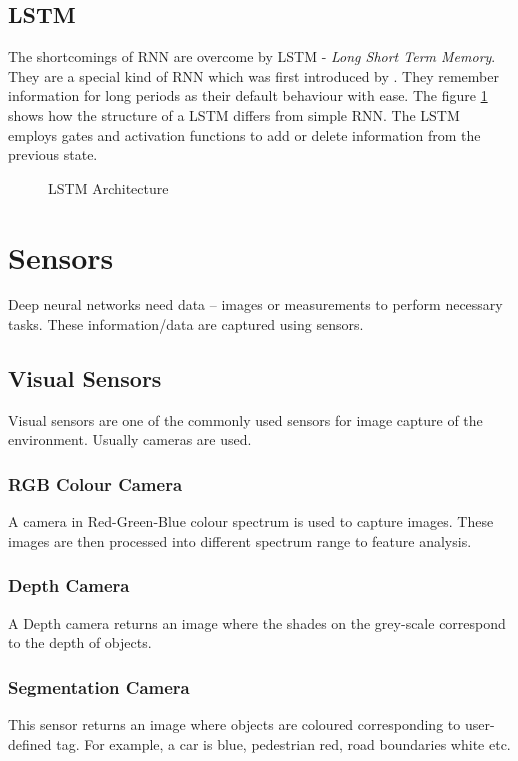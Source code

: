 \subsection{LSTM}
\label{subsubsec:lstm}
The shortcomings of RNN are overcome by LSTM - \textit{Long Short Term Memory}.
They are a special kind of RNN which was first introduced by \cite{LSTMPaper}. They remember
information for long periods as their default behaviour with ease. The figure
\ref{fig:lstm} shows how the structure of a LSTM differs from simple RNN. The LSTM employs
gates and activation functions to add or delete information from the previous state.

\begin{figure}[h]
	\begin{center}
	   \def\svgwidth{0.7\columnwidth}
%    
	\end{center}
    \caption{LSTM Architecture}
    \label{fig:lstm}
\end{figure}


\section{Sensors}
Deep neural networks need data -- images or measurements to perform necessary tasks. These
information/data are captured using sensors.
\subsection{Visual Sensors}
Visual sensors are one of the commonly used sensors for image capture of the environment.
Usually cameras are used.
\subsubsection*{RGB Colour Camera}
A camera in Red-Green-Blue colour spectrum is used to capture images. These images are
then processed into different spectrum range to feature analysis.
\subsubsection*{Depth Camera}
A Depth camera returns an image where the shades on the grey-scale correspond to the depth of objects.
\subsubsection*{Segmentation Camera}
This sensor returns an image where objects are coloured corresponding to user-defined tag.
For example, a car is blue, pedestrian red, road boundaries white etc.
